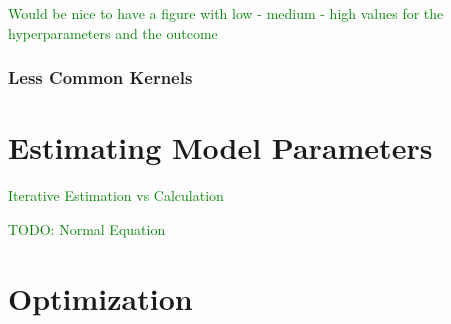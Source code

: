 \textcolor{green}{Would be nice to have a figure with low - medium - high values for the hyperparameters and the outcome}


\subsection{Less Common Kernels}










\chapter{Estimating Model Parameters}

\textcolor{green}{Iterative Estimation vs Calculation}

\textcolor{green}{TODO: Normal Equation}





\chapter{Optimization}

